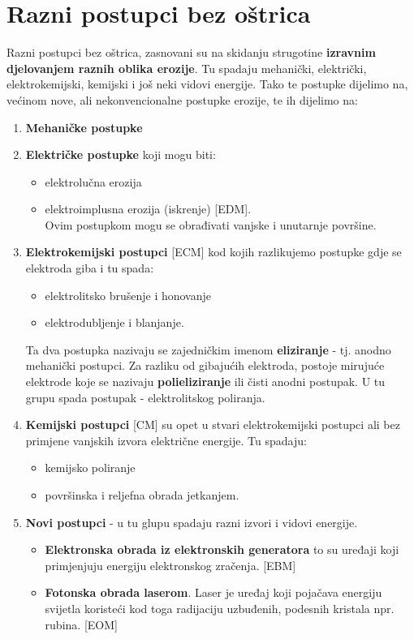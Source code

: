 \documentclass[a4paper,12pt]{article}
\numberwithin{figure}{section}
\begin{document}
\section{Razni postupci bez oštrica}
Razni postupci bez oštrica, zasnovani su na skidanju strugotine \textbf{izravnim djelovanjem raznih oblika erozije}. Tu spadaju mehanički, električki, elektrokemijski, kemijski i još neki vidovi energije. Tako te postupke dijelimo na, većinom nove, ali nekonvencionalne postupke erozije, te ih dijelimo na:
\begin{enumerate}
\item \textbf{Mehaničke postupke}
\item \textbf{Električke postupke} koji mogu biti:
\begin{itemize}
\item elektrolučna erozija
\item elektroimplusna erozija (iskrenje) [EDM].\\
Ovim postupkom mogu se obrađivati vanjske i unutarnje površine.
\end{itemize}
\item \textbf{Elektrokemijski postupci} [ECM] kod kojih razlikujemo postupke gdje se elektroda giba i tu spada:
\begin{itemize}
\item elektrolitsko brušenje i honovanje
\item elektrodubljenje i blanjanje.
\end{itemize}
Ta dva postupka nazivaju se zajedničkim imenom \textbf{eliziranje} - tj. anodno mehanički postupci. Za razliku od gibajućih elektroda, postoje mirujuće elektrode koje se nazivaju \textbf{polieliziranje} ili čisti anodni postupak. U tu grupu spada postupak - elektrolitskog poliranja.
\item \textbf{Kemijski postupci} [CM] su opet u stvari elektrokemijski postupci ali bez primjene vanjskih izvora električne energije. Tu spadaju:
\begin{itemize}
\item kemijsko poliranje
\item površinska i reljefna obrada jetkanjem.
\end{itemize}
\item \textbf{Novi postupci} - u tu glupu spadaju razni izvori i vidovi energije.
\begin{itemize}
\item \textbf{Elektronska obrada iz elektronskih generatora} to su uređaji koji primjenjuju energiju elektronskog zračenja. [EBM]
\item \textbf{Fotonska obrada laserom}. Laser je uređaj koji pojačava energiju svijetla koristeći kod toga radijaciju uzbuđenih, podesnih kristala npr. rubina. [EOM]

\end{itemize}
\end{enumerate}
\end{document}
